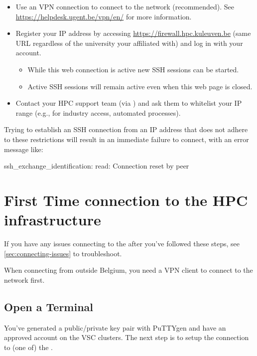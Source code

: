 \begin{itemize}
  \item Use an VPN connection to connect to the \university network (recommended).
      \ifgent
      See \url{https://helpdesk.ugent.be/vpn/en/} for more information.
      \fi
  \item Register your IP address by accessing \url{https://firewall.hpc.kuleuven.be} (same URL regardless of the university your affiliated with) and log in with your \university account.
      \begin{itemize}
      \item While this web connection is active new SSH sessions can be started.
      \item Active SSH sessions will remain active even when this web page is closed.
      \end{itemize}
  \item Contact your HPC support team (via \hpcinfo) and ask them to whitelist your IP range (e.g., for industry access, automated processes).
\end{itemize}

Trying to establish an SSH connection from an IP address that does not adhere to these restrictions
will result in an immediate failure to connect, with an error message like:

\begin{prompt}
ssh_exchange_identification: read: Connection reset by peer
\end{prompt}


\section{First Time connection to the HPC infrastructure}
\label{sec:first-time-connection-to-the-hpc}

If you have any issues connecting to the \hpc after you've followed these steps,
see \autoref{sec:connecting-issues} to troubleshoot.

\ifantwerpen
 When connecting from outside Belgium, you need a VPN client to connect to the \university network first.
\fi

\ifwindows

  \subsection{Open a Terminal}
  \label{sec:windows-open-a-terminal}

  You've generated a public/private key pair with PuTTYgen and have an approved
  account on the VSC clusters.  The next step is to setup the connection to (one
  of) the \hpc.

